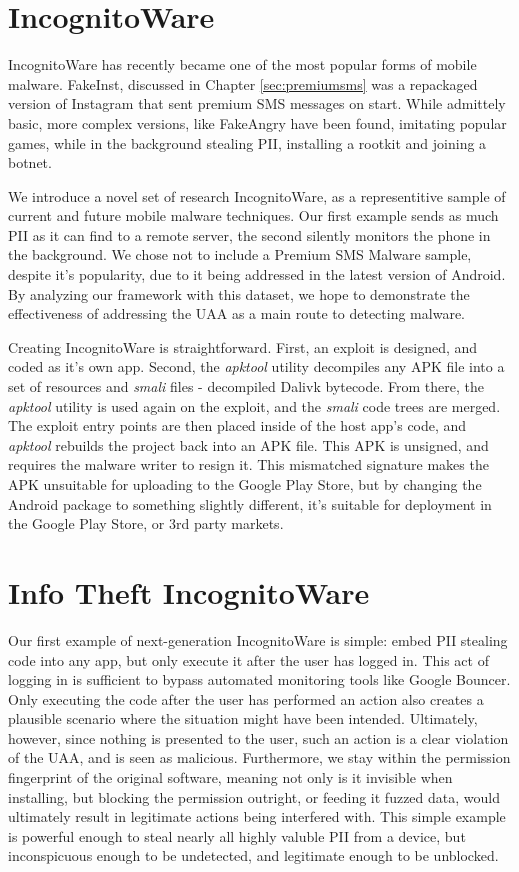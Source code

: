 \section{IncognitoWare}
IncognitoWare has recently became one of the most popular forms of mobile malware\citep{nq2013}. FakeInst, discussed in Chapter \ref{sec:premiumsms} was a repackaged version of Instagram\citep{instagramandroid} that sent premium SMS messages on start. While admittely basic, more complex versions, like FakeAngry\citep{fakeangry} have been found, imitating popular games, while in the background stealing PII, installing a rootkit and joining a botnet.

We introduce a novel set of research IncognitoWare, as a representitive sample of current and future mobile malware techniques. Our first example sends as much PII as it can find to a remote server, the second silently monitors the phone in the background. We chose not to include a Premium SMS Malware sample, despite it's popularity\citep{nq2013}, due to it being addressed in the latest version of Android. By analyzing our framework with this dataset, we hope to demonstrate the effectiveness of addressing the UAA as a main route to detecting malware.

Creating IncognitoWare is straightforward. First, an exploit is designed, and coded as it's own app. Second, the \textit{apktool}\citep{apktool} utility decompiles any APK file into a set of resources and \textit{smali} files - decompiled Dalivk bytecode. From there, the \textit{apktool} utility is used again on the exploit, and the \textit{smali} code trees are merged. The exploit entry points are then placed inside of the host app's code, and \textit{apktool} rebuilds the project back into an APK file. This APK is unsigned, and requires the malware writer to resign it. This mismatched signature makes the APK unsuitable for uploading to the Google Play Store, but by changing the Android package to something slightly different, it's suitable for deployment in the Google Play Store, or 3rd party markets.


\section{Info Theft IncognitoWare}
Our first example of next-generation IncognitoWare is simple: embed PII stealing code into any app, but only execute it after the user has logged in. This act of logging in is sufficient to bypass automated monitoring tools like Google Bouncer. Only executing the code after the user has performed an action also creates a plausible scenario where the situation might have been intended. Ultimately, however, since nothing is presented to the user, such an action is a clear violation of the UAA, and is seen as malicious. Furthermore, we stay within the permission fingerprint of the original software, meaning not only is it invisible when installing, but blocking the permission outright, or feeding it fuzzed data, would ultimately result in legitimate actions being interfered with. This simple example is powerful enough to steal nearly all highly valuble PII from a device, but inconspicuous enough to be undetected, and legitimate enough to be unblocked.

